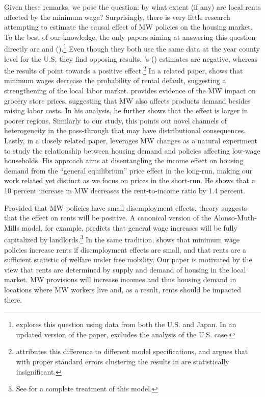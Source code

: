 Given these remarks, we pose the question: by what extent (if any) are local rents affected 
by the minimum wage? Surprisingly, there is very little research attempting to estimate 
the causal effect of MW policies on the housing market. To the best of our knowledge, the 
only papers aiming at answering this question directly are \textcite{Tidemann2018} and 
\citeauthor{Yamagishi2019} (\citeyear{Yamagishi2019, Yamagishi2020}).\footnote{
	\textcite{Yamagishi2019} explores this question using data from both the U.S. and Japan. 
	In an updated version of the paper, \textcite{Yamagishi2020} excludes the analysis of the 
	U.S. case.}
Even though they both use the same data at the year county level for the U.S, they find opposing 
results. \citeauthor{Tidemann2018}'s (\citeyear{Tidemann2018}) estimates are negative, whereas 
the results of \textcite{Yamagishi2019} point towards a positive effect.\footnote{
	\textcite{Yamagishi2019} attributes this difference to different model 
	specifications, and argues that with proper standard errors clustering the results in 
	\textcite{Tidemann2018} are statistically insignificant.} 
In a related paper, \textcite{AgarwalEtAl2019} shows that minimum wages decrease 
the probability of rental default, suggesting a strengthening of the local labor market. 
\textcite{Leung2018} provides evidence of the MW impact on grocery store prices,  
suggesting that MW also affects products demand besides raising labor costs. In his analysis, he 
further shows that the effect is larger in poorer regions. Similarly to our study, this points 
out novel channels of heterogeneity in the pass-through that may have distributional consequences.
Lastly, in a closely related paper, \textcite{Hughes2020} leverages MW changes as a 
natural experiment to study the relationship between housing demand and policies affecting 
low-wage households. His approach aims at disentangling the income effect on 
housing demand from the ``general equilibrium'' price effect in the long-run, making our work related yet 
distinct as we focus on prices in the short-run. He shows that a 10 percent 
increase in MW decreases the rent-to-income ratio by 1.4 percent. 

Provided that MW policies have small disemployment effects, theory suggests that the effect 
on rents will be positive. A canonical version of the Alonso-Muth-Mills model, for example, 
predicts that general wage increases will be fully capitalized by landlords.\footnote{See 
	\textcite{Brueckner1987} for a complete treatment of this model.} 
In the same tradition, \textcite{Yamagishi2020} shows that minimum wage policies increase 
rents if disemployment effects are small, and that rents are a sufficient statistic of welfare 
under free mobility. Our paper is motivated by the view that rents are determined by supply 
and demand of housing in the local market. MW provisions will increase incomes and thus 
housing demand in locations where MW workers live and, as a result, rents should be impacted 
there.

